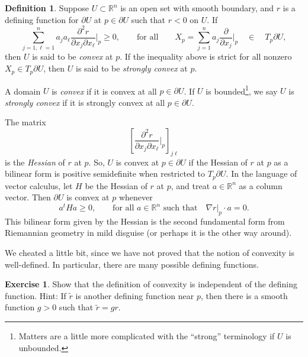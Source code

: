 \documentclass[12pt,openany]{book}
\newcommand{\R}{{\mathbb{R}}}
\newcommand{\myindex}[1]{#1\index{#1}}
\theoremstyle{plain}
\theoremstyle{remark}
\theoremstyle{definition}
\newtheorem{defn}[thm]{Definition}
\newenvironment{exbox}{%
    \def\FrameCommand{\vrule width 1pt \relax\hspace{10pt}}%
    \MakeFramed{\advance\hsize-\width\FrameRestore}%
}{%
    \endMakeFramed
}
\theoremstyle{exercise}
\newtheorem{exercise}{Exercise}[section]
\theoremstyle{example}
\begin{document}
\begin{defn}
Suppose $U \subset \R^n$ is an open set with
smooth boundary, %
and 
$r$ is a defining function for $\partial U$ at $p \in \partial
U$ such that $r < 0$ on $U$.
If
\begin{equation*}
\sum_{j=1,\ell=1}^n
a_j a_\ell \frac{\partial^2 r}{\partial x_j \partial x_\ell} \Big|_p \geq 0 ,
\qquad \text{for all} \qquad
X_p = \sum_{j=1}^n a_j 
\frac{\partial}{\partial x_j}\Big|_p \quad \in \quad T_p \partial U,
\end{equation*}
then $U$ is said to be \emph{\myindex{convex}} at $p$.  If the inequality
above is strict for all nonzero $X_p \in T_p \partial U$, then $U$ is said to be
\emph{\myindex{strongly convex}} at $p$.

A domain $U$ is \emph{convex} if it is convex at all $p \in \partial U$.
If $U$ is bounded\footnote{Matters are a little more complicated
with the ``strong'' terminology if $U$ is unbounded.}, we say
$U$ is \emph{strongly convex} if it is strongly convex at all $p \in
\partial U$.
\end{defn}

The matrix
\begin{equation*}
\left[ \frac{\partial^2 r}{\partial x_j \partial x_\ell} \Big|_p
\right]_{j\ell}
\end{equation*}
is the
\emph{\myindex{Hessian}} of $r$ at $p$.
So, $U$ is convex at $p \in \partial U$ if
the Hessian
of $r$ at $p$ as a bilinear form is positive semidefinite
when restricted to $T_p \partial U$.
In the language of vector calculus, let $H$ be the Hessian of $r$ at $p$, and treat
$a \in \R^n$ as a column vector.
Then 
$\partial U$ is convex at $p$ whenever
\begin{equation*}
a^t H a \geq 0 , \qquad \text{for all $a \in \R^n$ such that} \quad \nabla r|_p
\cdot a = 0 .
\end{equation*}
This bilinear form given by the Hessian is the second fundamental form from Riemannian
geometry in mild disguise (or perhaps it is the other way around).

We cheated a little bit, since we have not proved that
the notion of convexity is well-defined.  In particular, there are many possible
defining functions.

\begin{exbox}
\begin{exercise}
Show that the definition of convexity is independent of the defining
function.  Hint: If $\tilde{r}$ is another defining function near $p$,
then there is a smooth function $g > 0$ such that $\tilde{r} = g r$.
\end{exercise}
\end{exbox}
\end{document}
